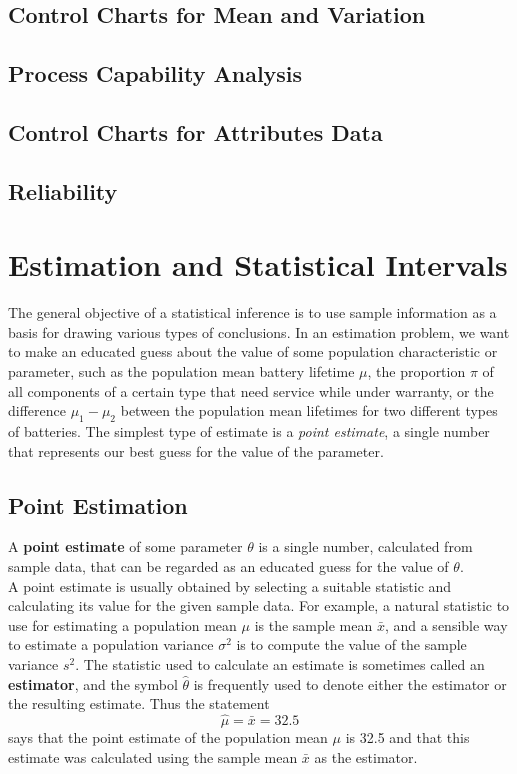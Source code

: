 \documentclass{article}
\begin{document}
	\subsection{Control Charts for Mean and Variation} %
	
	\subsection{Process Capability Analysis} %
	
	\subsection{Control Charts for Attributes Data} %
	
	\subsection{Reliability} %

\clearpage	
\section{Estimation and Statistical Intervals} %

The general objective of a statistical inference is to use sample information as a basis for drawing various types of conclusions. In an estimation problem, we want to make an educated guess about the value of some population characteristic or parameter, such as the population mean battery lifetime $\mu$, the proportion $\pi$ of all components of a certain type that need service while under warranty, or the difference $\mu_1-\mu_2$ between the population mean lifetimes for two different types of batteries. The simplest type of estimate is a \emph{point estimate}, a single number that represents our best guess for the value of the parameter.

	\subsection{Point Estimation} %
	A \textbf{point estimate} of some parameter $\theta$ is a single number, calculated from sample 
	data, that can be regarded as an educated guess for the value of $\theta$. \\
	A point estimate is usually obtained by selecting a suitable statistic and calculating its value for 
	the given sample data. For example, a natural statistic to use for estimating a population mean $
	\mu$ is the sample mean $\bar{x}$, and a sensible way to estimate a population variance $
	\sigma^2$ is to compute the value of the sample variance $s^2$. The statistic used to calculate 
	an estimate is sometimes called an \textbf{estimator}, and the symbol $\hat{\theta}$ is frequently 
	used to denote either the estimator or the resulting estimate. Thus the statement
	\[ \hat{\mu} = \bar{x} = 32.5 \]
	says that the point estimate of the population mean $\mu$ is 32.5 and that this estimate was 
	calculated using the sample mean $\bar{x}$ as the estimator.
	
\end{document}
